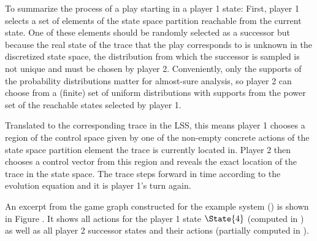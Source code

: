     To summarize the process of a play starting in a player 1 state:
    First, player 1 selects a set of elements of the state space partition reachable from the current state.
    One of these elements should be randomly selected as a successor but because the real state of the trace that the play corresponds to is unknown in the discretized state space, the distribution from which the successor is sampled is not unique and must be chosen by player 2.
    Conveniently, only the supports of the probability distributions matter for almost-sure analysis, so player 2 can choose from a (finite) set of uniform distributions with supports from the power set of the reachable states selected by player 1.

    Translated to the corresponding trace in the LSS, this means player 1 chooses a region of the control space given by one of the non-empty concrete actions of the state space partition element the trace is currently located in.
    Player 2 then chooses a control vector from this region and reveals the exact location of the trace in the state space.
    The trace steps forward in time according to the evolution equation and it is player 1's turn again.


    An excerpt from the game graph constructed for the example system () is shown in Figure .
    It shows all actions for the player 1 state $\State{4}$ (computed in ) as well as all player 2 successor states and their actions (partially computed in ).

\stopsubsection


